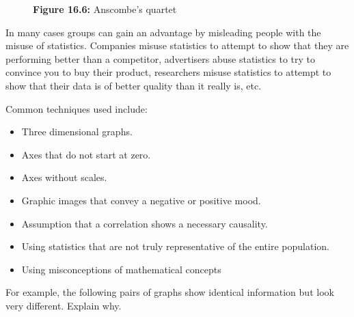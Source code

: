 \begin{description}[noitemsep]
\begin{description}[noitemsep]
\begin{figure}[H]
\begin{center}
      \vspace{2pt}
    \vspace{\rubberspace}\par \begin{cnxcaption}
	  \small \textbf{Figure 16.6: }Anscombe's quartet
	\end{cnxcaption}
    \vspace{.1in}
    \end{center}
 \end{figure}       \par 
\label{m39404*cid8}
            \nopagebreak
      \label{m39404*id215969}In many cases groups can gain an advantage by misleading people with the misuse of statistics. Companies misuse statistics to attempt to show that they are performing better than a competitor, advertisers abuse statistics to try to convince you to buy their product, researchers misuse statistics to attempt to show that their data is of better quality than it really is, etc.\par 
      \label{m39404*id215973}Common techniques used include:\par 
      \label{m39404*id215979}\begin{itemize}[noitemsep]
            \label{m39404*uid105}\item Three dimensional graphs.
\label{m39404*uid106}\item Axes that do not start at zero.
\label{m39404*uid107}\item Axes without scales.
\label{m39404*uid108}\item Graphic images that convey a negative or positive mood.
\label{m39404*uid109}\item Assumption that a correlation shows a necessary causality.
\label{m39404*uid110}\item Using statistics that are not truly representative of the entire population.
\label{m39404*uid111}\item Using misconceptions of mathematical concepts
\end{itemize}
      \label{m39404*id216070}For example, the following pairs of graphs show identical information but look very different. Explain why.\par 
      \label{m39404*id216074}
    \setcounter{subfigure}{0}
	\begin{figure}[H] %

\end{figure}
\end{description}
\end{description}
